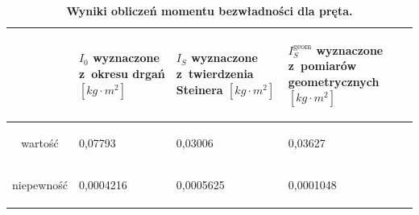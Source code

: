 \documentclass[a4paper,11pt]{article}
\begin{document}
\begin{table}[ht]
\caption{\textbf{Wyniki obliczeń momentu bezwładności dla pręta.}}
\label{tab:5}
\centering
\begin{tabular}{|c|m{30mm}|m{30mm}|m{30mm}|}
\hline
& \begin{center}
\textbf{$I_{0}$ wyznaczone z~okresu drgań $[kg\cdot m^{2}]$}
\end{center} & \begin{center}
\textbf{$I_{S}$ wyznaczone z~twierdzenia Steinera $[kg\cdot m^{2}]$}
\end{center} & \begin{center}
\textbf{$I_{S}^{\text{geom}}$ wyznaczone z~pomiarów geometrycznych $[kg\cdot m^{2}]$}
\end{center}  \\ \hline
wartość & \begin{center} 0,07793\end{center} & \begin{center}0,03006\end{center} & \begin{center}0,03627\end{center}\\ \hline
niepewność &\begin{center} 0,0004216\end{center} & \begin{center}0,0005625\end{center} & \begin{center} 0,0001048 \end{center}\\ \hline

\end{tabular}
\end{table}
\end{document}
